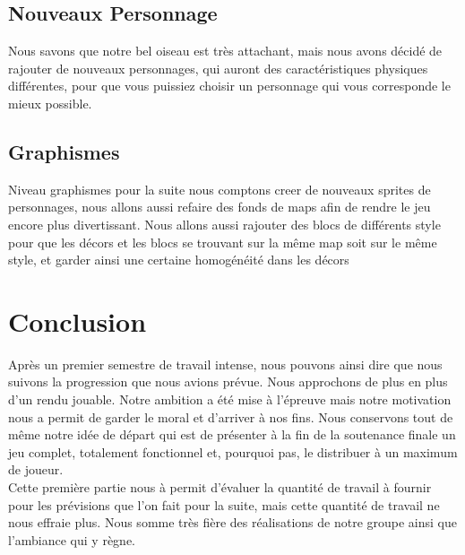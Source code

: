\documentclass [11pt]{report}
\begin{document}
	
	\vspace{10mm}



	\section{Nouveaux Personnage}
	Nous savons que notre bel oiseau est très attachant, mais nous avons décidé de rajouter de nouveaux personnages, qui auront des caractéristiques physiques différentes, pour que vous puissiez choisir un personnage qui vous corresponde le mieux possible.
	
	
		
		\vspace{10mm}
	
	
	
	\section{Graphismes}
	Niveau graphismes pour la suite nous comptons creer de nouveaux sprites de personnages, nous allons aussi refaire des fonds de maps afin de rendre le jeu encore plus divertissant. Nous allons aussi rajouter des blocs de différents style pour que les décors et les blocs se trouvant sur la même map soit sur le même style, et garder ainsi une certaine homogénéité dans les décors
\newpage

\chapter*{Conclusion}

Après un premier semestre de travail intense, nous pouvons ainsi dire que nous suivons la progression que nous avions prévue. Nous approchons de plus en plus d'un rendu jouable. Notre ambition a été mise à l'épreuve mais notre motivation nous a permit de garder le moral et d'arriver à nos fins. Nous conservons tout de même notre idée de départ qui est de présenter à la fin de la soutenance finale un jeu complet, totalement fonctionnel et, pourquoi pas, le distribuer à un maximum de joueur.\\

Cette première partie nous à permit d'évaluer la quantité de travail à fournir pour les prévisions que l'on fait pour la suite, mais cette quantité de travail ne nous effraie plus. Nous somme très fière des réalisations de notre groupe ainsi que l'ambiance qui y règne.\\
\end{document}
